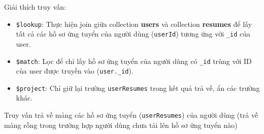 Giải thích truy vấn:
\begin{itemize}
    \item \texttt{\$lookup}: Thực hiện join giữa collection \textbf{users} và collection \textbf{resumes} để lấy tất cả các hồ sơ ứng tuyển của người dùng (\texttt{userId}) tương ứng với \texttt{\_id} của user.
    \item \texttt{\$match}: Lọc để chỉ lấy hồ sơ ứng tuyển của người dùng có \texttt{\_id} trùng với ID của user được truyền vào (\texttt{user.\_id}).
    \item \texttt{\$project}: Chỉ giữ lại trường \texttt{userResumes} trong kết quả trả về, ẩn các trường khác.
\end{itemize}

Truy vấn trả về mảng các hồ sơ ứng tuyển (\texttt{userResumes}) của người dùng (trả về mảng rỗng trong trường hợp người dùng chưa tải lên hồ sơ ứng tuyển nào)